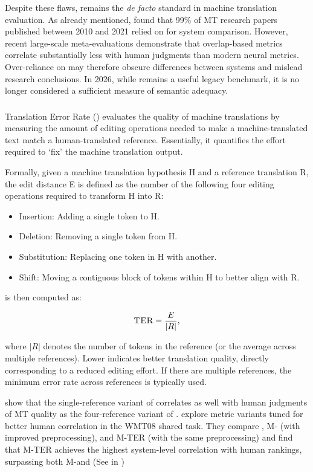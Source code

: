 Despite these flaws, \bleu remains the \textit{de facto} standard in machine translation evaluation. As already mentioned, \cite{marie-etal-2021-scientific} found that 99\% of MT research papers published between 2010 and 2021 relied on \bleu for system comparison. However, recent large-scale meta-evaluations \cite{mathur-etal-2020-tangled, freitag-etal-2022-results} demonstrate that overlap-based metrics correlate substantially less with human judgments than modern neural metrics. Over-reliance on \bleu may therefore obscure differences between systems and mislead research conclusions. In 2026, while \bleu remains a useful legacy benchmark, it is no longer considered a sufficient measure of semantic adequacy.

\subsubsection{\ter}
Translation Error Rate (\ter) \citep{ter} evaluates the quality of machine translations by measuring the amount of editing operations needed to make a machine-translated text match a human-translated reference. Essentially, it quantifies the effort required to `fix' the machine translation output. 

Formally, given a machine translation hypothesis H and a reference translation R, the edit distance E is defined as the number of the following four editing operations required to transform H into R: 

\begin{itemize}
    \item  Insertion: Adding a single token to H.
    \item  Deletion: Removing a single token from H.
    \item  Substitution: Replacing one token in H with another.
    \item  Shift: Moving a contiguous block of tokens within H to better align with R.
\end{itemize}

\ter is then computed as:

$$\textsc{TER} = \frac{E}{|R|},$$

where $|R|$ denotes the number of tokens in the reference (or the average across multiple references). Lower \ter indicates better translation quality, directly corresponding to a reduced editing effort. If there are multiple references, the minimum error rate across references is typically used.

\cite{ter} show that the single-reference variant of \ter correlates as well with human judgments of MT quality as the four-reference variant of \bleu. \cite{agarwal-lavie-2008-meteor} explore metric variants tuned for better human correlation in the WMT08 shared task. They compare \meteor \cite{meteor07}, \textsc{M-\bleu} (\bleu with improved preprocessing), and \textsc{M-TER} (\ter with the same preprocessing) and find that \textsc{M-TER} achieves the highest system-level correlation with human rankings, surpassing both \textsc{M-}\bleu and \meteor (See in )


